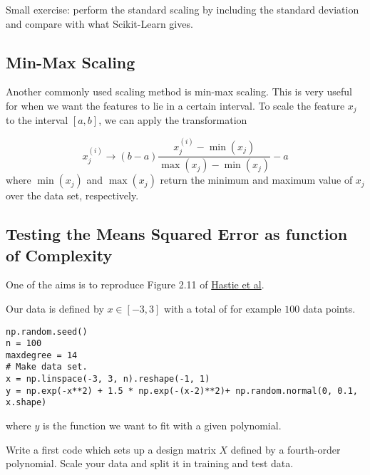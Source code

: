 \documentclass[%
oneside,                 %
final,                   %
10pt]{article}
\begin{document}
Small exercise: perform the standard scaling by including the standard deviation and compare with what Scikit-Learn gives.

\subsection*{Min-Max Scaling}

Another commonly used scaling method is min-max scaling. This is very
useful for when we want the features to lie in a certain interval. To
scale the feature $x_j$ to the interval $[a, b]$, we can apply the
transformation

\[
x_j^{(i)} \rightarrow (b-a)\frac{x_j^{(i)} - \min(x_j)}{\max(x_j) - \min(x_j)} - a
\]
where $\min(x_j)$ and $\max(x_j)$ return the minimum and maximum value of $x_j$ over the data set, respectively.

\subsection*{Testing the Means Squared Error as function of Complexity}

One of 
the aims is to reproduce Figure 2.11 of \href{{https://github.com/CompPhysics/MLErasmus/blob/master/doc/Textbooks/elementsstat.pdf}}{Hastie et al}.

Our data is defined by $x\in [-3,3]$ with a total of for example $100$ data points.







\begin{verbatim}
np.random.seed()
n = 100
maxdegree = 14
# Make data set.
x = np.linspace(-3, 3, n).reshape(-1, 1)
y = np.exp(-x**2) + 1.5 * np.exp(-(x-2)**2)+ np.random.normal(0, 0.1, x.shape)

\end{verbatim}

where $y$ is the function we want to fit with a given polynomial.

Write a first code which sets up a design matrix $X$ defined by a fourth-order polynomial.  Scale your data and split it in training and test data. 
\end{document}
